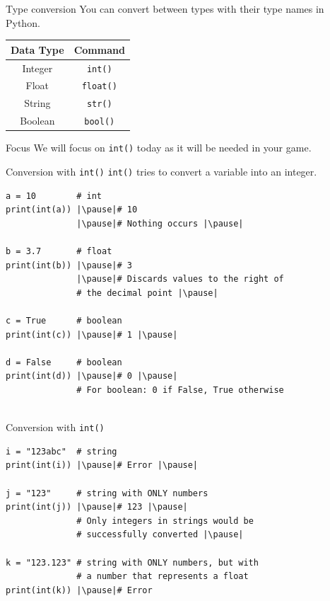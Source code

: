 \documentclass[dvipsnames, svgnames, x11names]{beamer}
\begin{document}
\begin{frame}{Type conversion}
You can convert between types with their type names in Python.
\begin{center}
	\begin{tabular}{|c|c|}\hline
		Data Type & Command\\\hline
		Integer & \texttt{int()}\\\hline
		Float & \texttt{float()}\\\hline
		String & \texttt{str()}\\\hline
		Boolean & \texttt{bool()}\\\hline
	\end{tabular}
\end{center}

\begin{block}{Focus}
We will focus on \texttt{int()} today as it will be needed in your game.
\end{block}

\end{frame}

\begin{frame}[fragile]{Conversion with \texttt{int()}}
\texttt{int()} tries to convert a variable into an integer.
\begin{verbatim} 
a = 10        # int
print(int(a)) |\pause|# 10
			  |\pause|# Nothing occurs |\pause|
			  
b = 3.7       # float
print(int(b)) |\pause|# 3
              |\pause|# Discards values to the right of 
              # the decimal point |\pause|
              
c = True      # boolean
print(int(c)) |\pause|# 1 |\pause|

d = False     # boolean
print(int(d)) |\pause|# 0 |\pause|
              # For boolean: 0 if False, True otherwise
              
\end{verbatim}
\end{frame}

\begin{frame}[fragile]{Conversion with \texttt{int()}}
\begin{verbatim}
i = "123abc"  # string
print(int(i)) |\pause|# Error |\pause|

j = "123"     # string with ONLY numbers
print(int(j)) |\pause|# 123 |\pause|
              # Only integers in strings would be 
              # successfully converted |\pause|

k = "123.123" # string with ONLY numbers, but with 
              # a number that represents a float
print(int(k)) |\pause|# Error 
\end{verbatim}
\end{frame}
\end{document}
